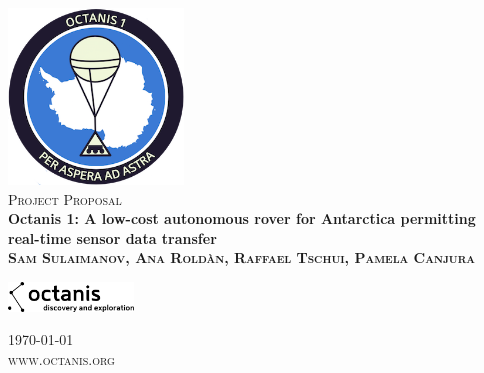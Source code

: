 \documentclass[a4paper,12pt]{article}
\begin{document}
\begin{titlepage}
\begin{center}

\includegraphics[width=0.35\textwidth]{patch}~\\[2cm]

\textsc{\Large Project Proposal}\\[0.5cm]

\huge \bfseries Octanis 1: A low-cost autonomous rover for Antarctica permitting real-time sensor data transfer \\[0.4cm] 

\textsc{\small Sam Sulaimanov, Ana Roldàn, Raffael Tschui, Pamela Canjura} 
 
\vspace{23pt}

\includegraphics[width=0.25\textwidth]{black_logo} \\


\vfill

{\large \today} \\
\textsc{\small www.octanis.org} 

\end{center}
\end{titlepage}


\tableofcontents

\pagebreak
\end{document}

